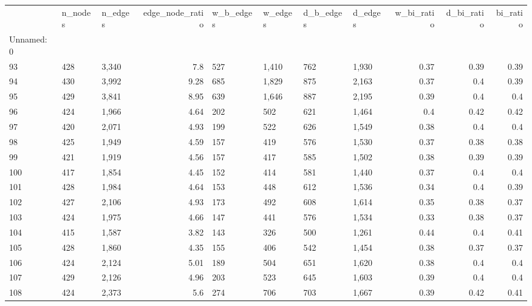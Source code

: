 \begin{tabular}{lllrllllrrr}
\toprule
{} & n\_nodes & n\_edges &  edge\_node\_ratio & w\_b\_edges & w\_edges & d\_b\_edges & d\_edges &  w\_bi\_ratio &  d\_bi\_ratio &  bi\_ratio \\
Unnamed: 0 &         &         &                  &           &         &           &         &             &             &           \\
\midrule
93         &     428 &   3,340 &              7.8 &       527 &   1,410 &       762 &   1,930 &        0.37 &        0.39 &      0.39 \\
94         &     430 &   3,992 &             9.28 &       685 &   1,829 &       875 &   2,163 &        0.37 &         0.4 &      0.39 \\
95         &     429 &   3,841 &             8.95 &       639 &   1,646 &       887 &   2,195 &        0.39 &         0.4 &       0.4 \\
96         &     424 &   1,966 &             4.64 &       202 &     502 &       621 &   1,464 &         0.4 &        0.42 &      0.42 \\
97         &     420 &   2,071 &             4.93 &       199 &     522 &       626 &   1,549 &        0.38 &         0.4 &       0.4 \\
98         &     425 &   1,949 &             4.59 &       157 &     419 &       576 &   1,530 &        0.37 &        0.38 &      0.38 \\
99         &     421 &   1,919 &             4.56 &       157 &     417 &       585 &   1,502 &        0.38 &        0.39 &      0.39 \\
100        &     417 &   1,854 &             4.45 &       152 &     414 &       581 &   1,440 &        0.37 &         0.4 &       0.4 \\
101        &     428 &   1,984 &             4.64 &       153 &     448 &       612 &   1,536 &        0.34 &         0.4 &      0.39 \\
102        &     427 &   2,106 &             4.93 &       173 &     492 &       608 &   1,614 &        0.35 &        0.38 &      0.37 \\
103        &     424 &   1,975 &             4.66 &       147 &     441 &       576 &   1,534 &        0.33 &        0.38 &      0.37 \\
104        &     415 &   1,587 &             3.82 &       143 &     326 &       500 &   1,261 &        0.44 &         0.4 &      0.41 \\
105        &     428 &   1,860 &             4.35 &       155 &     406 &       542 &   1,454 &        0.38 &        0.37 &      0.37 \\
106        &     424 &   2,124 &             5.01 &       189 &     504 &       651 &   1,620 &        0.38 &         0.4 &       0.4 \\
107        &     429 &   2,126 &             4.96 &       203 &     523 &       645 &   1,603 &        0.39 &         0.4 &       0.4 \\
108        &     424 &   2,373 &              5.6 &       274 &     706 &       703 &   1,667 &        0.39 &        0.42 &      0.41 \\
\bottomrule
\end{tabular}
